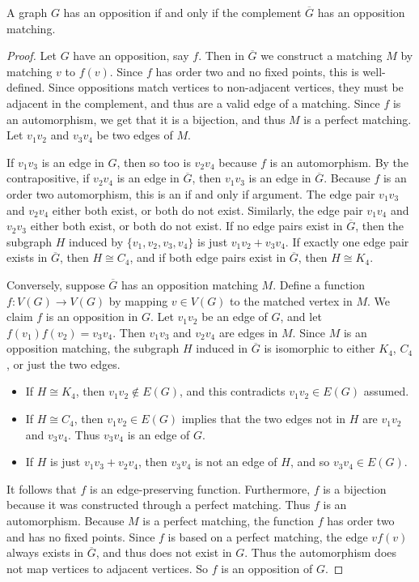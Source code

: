\documentclass[10pt,a4paper]{amsart}
\begin{document}
\begin{theorem}\label{thm:matchingCharacterization}
    A graph $G$ has an opposition if and only if the complement $\overline{G}$
    has an opposition matching.
\end{theorem}

\begin{proof}
    Let $G$ have an opposition, say $f$. Then in $\overline{G}$ we construct a
    matching $M$ by matching $v$ to $f(v)$. Since $f$ has order two and no
    fixed points, this is well-defined. Since oppositions match vertices to
    non-adjacent vertices, they must be adjacent in the complement, and thus
    are a valid edge of a matching. Since $f$ is an automorphism, we get that
    it is a bijection, and thus $M$ is a perfect matching. Let $v_1v_2$ and
    $v_3v_4$ be two edges of $M$.

    If $v_1v_3$ is an edge in $G$, then so too is $v_2v_4$ because $f$ is an
    automorphism. By the contrapositive, if $v_2v_4$ is an edge in
    $\overline{G}$, then $v_1v_3$ is an edge in $\overline{G}$. Because $f$ is
    an order two automorphism, this is an if and only if argument. The edge
    pair $v_1v_3$ and $v_2v_4$ either both exist, or both do not exist.
    Similarly, the edge pair $v_1v_4$ and $v_2v_3$ either both exist, or both
    do not exist. If no edge pairs exist in $\overline{G}$, then the subgraph
    $H$ induced by $\{v_1,v_2,v_3,v_4\}$ is just $v_1v_2+v_3v_4$. If exactly
    one edge pair exists in $\overline{G}$, then $H \cong C_4$, and if both
    edge pairs exist in $\overline{G}$, then $H \cong K_4$.

    Conversely, suppose $\overline{G}$ has an opposition matching $M$. Define a
    function $f:V(G)\to V(G)$ by mapping $v\in V(G)$ to the matched vertex in
    $M$. We claim $f$ is an opposition in $G$. Let $v_1v_2$ be an edge of $G$,
    and let $f(v_1)f(v_2)=v_3v_4$. Then $v_1v_3$ and $v_2v_4$ are edges in $M$.
    Since $M$ is an opposition matching, the subgraph $H$ induced in
    $\overline{G}$ is isomorphic to either $K_4$, $C_4$, or just the two edges. 
    \begin{itemize}
        \item
            If $H\cong K_4$, then $v_1v_2\not\in E(G)$, and this contradicts
            $v_1v_2\in E(G)$ assumed.
        \item
            If $H\cong C_4$, then $v_1v_2\in E(G)$ implies that the two edges
            not in $H$ are $v_1v_2$ and $v_3v_4$. Thus $v_3v_4$ is an edge of
            $G$.
        \item
            If $H$ is just $v_1v_3 + v_2v_4$, then $v_3v_4$ is not an edge of
            $H$, and so $v_3v_4\in E(G)$.
    \end{itemize}
    It follows that $f$ is an edge-preserving function. Furthermore, $f$ is a
    bijection because it was constructed through a perfect matching. Thus $f$
    is an automorphism. Because $M$ is a perfect matching, the function $f$ has
    order two and has no fixed points. Since $f$ is based on a perfect
    matching, the edge $vf(v)$ always exists in $\overline{G}$, and thus does
    not exist in $G$. Thus the automorphism does not map vertices to adjacent
    vertices. So $f$ is an opposition of $G$.
\end{proof}
\end{document}
